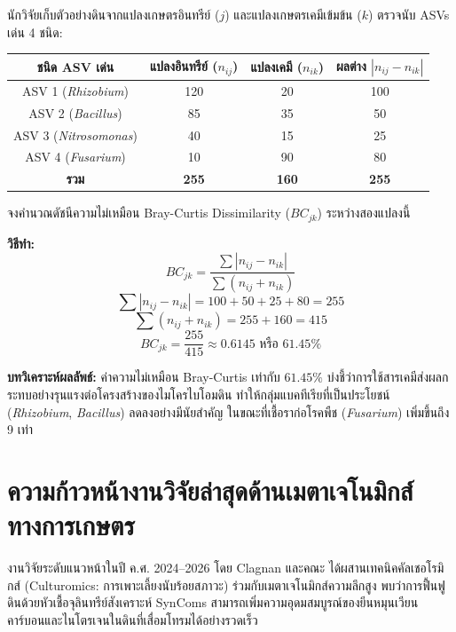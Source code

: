 \begin{worked}
นักวิจัยเก็บตัวอย่างดินจากแปลงเกษตรอินทรีย์ ($j$) และแปลงเกษตรเคมีเข้มข้น ($k$) ตรวจนับ ASVs เด่น 4 ชนิด:

\begin{center}
\small
\begin{tabular}{cccc}
\toprule
\textbf{ชนิด ASV เด่น} & \textbf{แปลงอินทรีย์ ($n_{ij}$)} & \textbf{แปลงเคมี ($n_{ik}$)} & \textbf{ผลต่าง $|n_{ij} - n_{ik}|$} \\
\midrule
ASV 1 (\textit{Rhizobium}) & 120 & 20 & 100 \\
ASV 2 (\textit{Bacillus}) & 85 & 35 & 50 \\
ASV 3 (\textit{Nitrosomonas}) & 40 & 15 & 25 \\
ASV 4 (\textit{Fusarium}) & 10 & 90 & 80 \\
\midrule
\textbf{รวม} & \textbf{255} & \textbf{160} & \textbf{255} \\
\bottomrule
\end{tabular}
\end{center}

จงคำนวณดัชนีความไม่เหมือน Bray-Curtis Dissimilarity ($BC_{jk}$) ระหว่างสองแปลงนี้

\textbf{วิธีทำ:}
$$BC_{jk} = \frac{\sum |n_{ij} - n_{ik}|}{\sum (n_{ij} + n_{ik})}$$
$$\sum |n_{ij} - n_{ik}| = 100 + 50 + 25 + 80 = 255$$
$$\sum (n_{ij} + n_{ik}) = 255 + 160 = 415$$
$$BC_{jk} = \frac{255}{415} \approx 0.6145 \text{ หรือ } 61.45\%$$

\textbf{บทวิเคราะห์ผลลัพธ์:} ค่าความไม่เหมือน Bray-Curtis เท่ากับ $61.45\%$ บ่งชี้ว่าการใช้สารเคมีส่งผลกระทบอย่างรุนแรงต่อโครงสร้างของไมโครไบโอมดิน ทำให้กลุ่มแบคทีเรียที่เป็นประโยชน์ (\textit{Rhizobium}, \textit{Bacillus}) ลดลงอย่างมีนัยสำคัญ ในขณะที่เชื้อราก่อโรคพืช (\textit{Fusarium}) เพิ่มขึ้นถึง 9 เท่า
\end{worked}

\section{ความก้าวหน้างานวิจัยล่าสุดด้านเมตาเจโนมิกส์ทางการเกษตร}

งานวิจัยระดับแนวหน้าในปี ค.ศ. 2024–2026 โดย Clagnan และคณะ \cite{pmid39526137} ได้ผสานเทคนิคคัลเชอโรมิกส์ (Culturomics: การเพาะเลี้ยงนับร้อยสภาวะ) ร่วมกับเมตาเจโนมิกส์ความลึกสูง พบว่าการฟื้นฟูดินด้วยหัวเชื้อจุลินทรีย์สังเคราะห์ SynComs สามารถเพิ่มความอุดมสมบูรณ์ของยีนหมุนเวียนคาร์บอนและไนโตรเจนในดินที่เสื่อมโทรมได้อย่างรวดเร็ว

